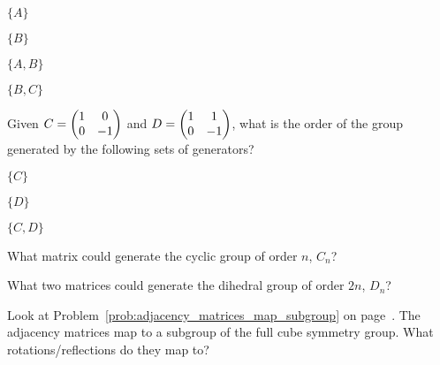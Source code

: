 \documentclass[../gatm_answers.tex]{subfiles}
\begin{document}
\begin{inner_problem}[start=1]
\item $\{A\}$
\end{inner_problem}

\begin{inner_problem}
\item $\{B\}$
\end{inner_problem}

\begin{inner_problem}
\item $\{A,B\}$
\end{inner_problem}

\begin{inner_problem}
\item $\{B,C\}$
\end{inner_problem}

\begin{outer_problem}
\item Given $C=\begin{pmatrix} 1 & 0 \\ 0 & -1 \end{pmatrix}$ and $D=\begin{pmatrix} 1 & 1 \\ 0 & -1 \end{pmatrix}$, what is the order of the group generated by the following sets of generators?
\end{outer_problem}

\begin{inner_problem}[start=1]
\item $\{C\}$
\end{inner_problem}

\begin{inner_problem}
\item $\{D\}$
\end{inner_problem}

\begin{inner_problem}
\item $\{C,D\}$
\end{inner_problem}

\begin{outer_problem}
\item What matrix could generate the cyclic group of order $n$, $C_n$?
\end{outer_problem}

\begin{outer_problem}
\item What two matrices could generate the dihedral group of order $2n$, $D_n$?\end{outer_problem}

\begin{outer_problem}
\item Look at Problem~\ref{prob:adjacency_matrices_map_subgroup} on page~\pageref{prob:adjacency_matrices_map_subgroup}. The adjacency matrices map to a subgroup of the full cube symmetry group. What rotations/reflections do they map to?
\end{outer_problem}
\end{document}
